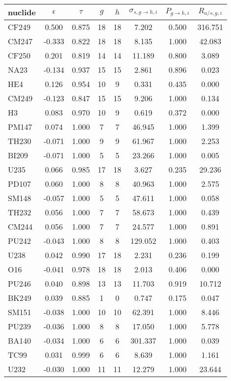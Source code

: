 \begin{tabular}{|l|ccccccc|}
\hline
nuclide & $\epsilon$ & $\tau$ & $g$ & $h$ & $\sigma_{s,g\to h,i}$ & $P_{g\to h,i}$ & $R_{a/s,g,i}$\\
\hline
CF249 & 0.500 & 0.875 & 18 & 18 & 7.202 & 0.500 & 316.751\\
CM247 & -0.333 & 0.822 & 18 & 18 & 8.135 & 1.000 & 42.083\\
CF250 & 0.201 & 0.819 & 14 & 14 & 11.189 & 0.800 & 3.089\\
NA23 & -0.134 & 0.937 & 15 & 15 & 2.861 & 0.896 & 0.023\\
HE4 & 0.126 & 0.954 & 10 & 9 & 0.331 & 0.435 & 0.000\\
CM249 & -0.123 & 0.847 & 15 & 15 & 9.206 & 1.000 & 0.134\\
H3 & 0.083 & 0.970 & 10 & 9 & 0.619 & 0.372 & 0.000\\
PM147 & 0.074 & 1.000 & 7 & 7 & 46.945 & 1.000 & 1.399\\
TH230 & -0.071 & 1.000 & 9 & 9 & 61.967 & 1.000 & 2.253\\
BI209 & -0.071 & 1.000 & 5 & 5 & 23.266 & 1.000 & 0.005\\
U235 & 0.066 & 0.985 & 17 & 18 & 3.627 & 0.235 & 29.236\\
PD107 & 0.060 & 1.000 & 8 & 8 & 40.963 & 1.000 & 2.575\\
SM148 & -0.057 & 1.000 & 5 & 5 & 47.611 & 1.000 & 0.058\\
TH232 & 0.056 & 1.000 & 7 & 7 & 58.673 & 1.000 & 0.439\\
CM244 & 0.056 & 1.000 & 7 & 7 & 24.577 & 1.000 & 0.891\\
PU242 & -0.043 & 1.000 & 8 & 8 & 129.052 & 1.000 & 0.403\\
U238 & 0.042 & 0.990 & 17 & 18 & 2.231 & 0.236 & 0.199\\
O16 & -0.041 & 0.978 & 18 & 18 & 2.013 & 0.406 & 0.000\\
PU246 & 0.040 & 0.898 & 13 & 13 & 11.703 & 0.919 & 10.712\\
BK249 & 0.039 & 0.885 & 1 & 0 & 0.747 & 0.175 & 0.047\\
SM151 & -0.038 & 1.000 & 10 & 10 & 62.391 & 1.000 & 8.446\\
PU239 & -0.036 & 1.000 & 8 & 8 & 17.050 & 1.000 & 5.778\\
BA140 & -0.034 & 1.000 & 6 & 6 & 301.337 & 1.000 & 0.039\\
TC99 & 0.031 & 0.999 & 6 & 6 & 8.639 & 1.000 & 1.161\\
U232 & -0.030 & 1.000 & 11 & 11 & 12.279 & 1.000 & 23.644\\

\end{tabular}
